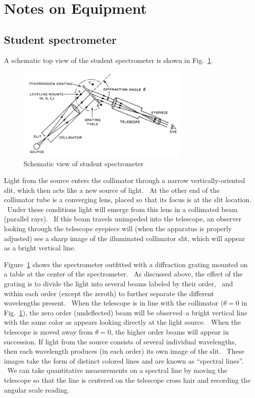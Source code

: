 \documentclass{article}
\begin{document}
\section{Notes on Equipment}

\subsection{Student spectrometer}

A schematic top view of the student spectrometer is shown in Fig.~\ref{fig:studentspec}.

\begin{figure}
\begin{centering}
\includegraphics[width=0.75\textwidth]{images/spectrometer-top.jpg} 
\caption{Schematic view of student spectrometer}
\label{fig:studentspec}
\end{centering}
\end{figure}

Light from the source enters the collimator through a narrow
vertically-oriented slit, which then acts like a new source of light.
\ At the other end of the collimator tube is a converging lens, placed
so that its focus is at the slit location. \ Under these conditions
light will emerge from this lens in a collimated beam (parallel rays).
\ If this beam travels unimpeded into the telescope, an observer
looking through the telescope eyepiece will (when the apparatus is
properly adjusted) see a sharp image of the illuminated collimator
slit, which will appear as a bright vertical line.

Figure~\ref{fig:studentspec} shows the spectrometer outfitted with a diffraction grating
mounted on a table at the center of the spectrometer. \ As discussed
above, the effect of the grating is to divide the light into several
beams labeled by their order, \ and within each order (except the
zeroth) to further separate the different wavelengths present. \ When
the telescope is in line with the collimator ($\theta = 0$ in Fig.~\ref{fig:studentspec}),
the zero order (undeflected) beam will be observed--a bright vertical
line with the same color as appears looking directly at the light
source. \ When the telescope is moved away from $\theta=0$, the higher order
beams will appear in succession. If light from the source consists of
several individual wavelengths, then each wavelength produces (in each
order) its own image of the slit. \ These images take the form of
distinct colored lines and are known as ``spectral
lines''. \ We can take quantitative measurements on a
spectral line by moving the telescope so that the line is centered on
the telescope cross hair 
and recording the angular scale reading.
\end{document}
